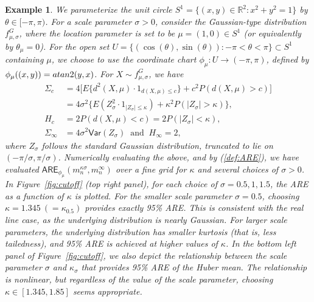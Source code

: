 \documentclass[preprint]{imsart}
\newcommand{\bbR}{\mathbb{R}}
\theoremstyle{plain}
\newtheorem{example}{Example}
\theoremstyle{remark}
\begin{document}
\begin{example}\label{0.95efficiency_S}
We parameterize the unit circle $S^{1}=\{(x,y) \in \bbR^2: x^2 + y^2 = 1\}$ by $\theta \in [-\pi, \pi)$. For a scale parameter $\sigma>0$, consider the Gaussian-type distribution $f^G_{\mu,\sigma}$, where the location parameter is set to be $\mu = (1,0) \in S^1$ (or equivalently by $\theta_\mu = 0$). For the open set $U = \{(\cos(\theta), \sin(\theta)): -\pi < \theta < \pi\} \subset S^1$ containing $\mu$, we choose to use the coordinate chart $\phi_{\mu}:U \rightarrow (-\pi, \pi)$, defined by $\phi_\mu((x,y)) = {\rm atan2}(y, x)$. For $X \sim f^{G}_{\mu, \sigma}$, we have 
\begin{equation}\label{eq:1d-hessianandcovariances}
\begin{aligned}
    \Sigma_{c} & =4\big[E\{d^2(X, \mu) \cdot 1_{d(X, \mu) \le c}\} + c^2P(d(X, \mu) > c)\big]  \\
    & = 4\sigma^2\{ E (Z_\sigma^2\cdot 1_{ |Z_\sigma| \le \kappa}) + \kappa^2 P(|Z_\sigma| > \kappa)\}, \\
    H_{c} & = 2P(d(X, \mu) < c) = 2P(|Z_\sigma| < \kappa),  \\
    \Sigma_{\infty} & = 4\sigma^2 \textsf{Var}(Z_\sigma) ~ \mbox{ and  } ~ H_{\infty} = 2,
\end{aligned}
\end{equation} 
%
where $Z_\sigma$ follows the standard Gaussian distribution, truncated to lie on $(-\pi/\sigma, \pi/\sigma)$. Numerically evaluating the above, and by (\ref{def:ARE}), we have evaluated $\textsf{ARE}_{\phi_{\mu}}(m^{\kappa \sigma}_{n}, m^{\infty}_{n})$ over a fine grid for $\kappa$ and several choices of $\sigma > 0$. In Figure~\ref{fig:cutoff} (top right panel), for each choice of $\sigma = 0.5, 1, 1.5$, the ARE as a function of $\kappa$ is plotted. 
For the smaller scale parameter $\sigma = 0.5$, choosing $\kappa = 1.345 ~ (=\kappa_{0.5})$ provides exactly 95\% ARE. This is consistent with the real line case, as the underlying distribution is nearly Gaussian. %
For larger scale parameters, the underlying distribution has smaller kurtosis (that is, less tailedness), and 95\% ARE is achieved at higher values of $\kappa$. In the bottom left panel of Figure~\ref{fig:cutoff}, we also depict the relationship between the scale parameter $\sigma$ and $\kappa_{\sigma}$ that provides 95\% ARE of the Huber mean. The relationship is nonlinear, but regardless of the value of the scale parameter, choosing $\kappa \in [1.345, 1.85]$ seems appropriate. 
\end{example}
\end{document}
